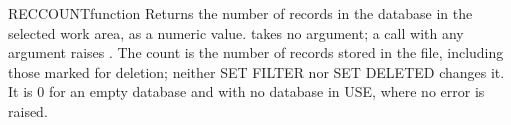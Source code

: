 \begin{XbaseEntry}{RECCOUNT}{function}
Returns the number of records in the database in the selected work area, as a numeric value.
\Syntax
{}
\Usage
{} takes no argument; a call with any argument raises . The count is the number of records stored in the file, including those marked for deletion; neither SET FILTER nor SET DELETED changes it. It is 0 for an empty database and with no database in USE, where no error is raised.
\Examples
{}
\end{XbaseEntry}

